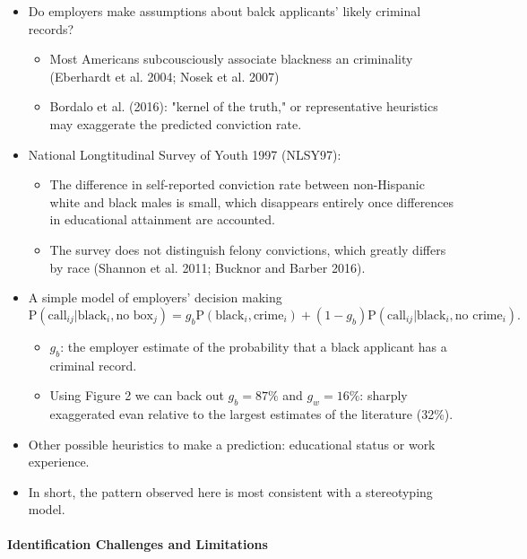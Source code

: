 \documentclass[../root]{subfiles}
\begin{document}
    \begin{itemize}
      \item Do employers make assumptions about balck applicants' likely criminal records?
      \begin{itemize}
        \item Most Americans subcousciously associate blackness an criminality (Eberhardt et al. 2004; Nosek et al. 2007)
        \item Bordalo et al. (2016): "kernel of the truth," or representative heuristics may exaggerate the predicted conviction rate.
      \end{itemize}
      \item National Longtitudinal Survey of Youth 1997 (NLSY97):
      \begin{itemize}
        \item The difference in self-reported conviction rate between non-Hispanic white and black males is small, which disappears entirely once differences in educational attainment are accounted.
        \item The survey does not distinguish felony convictions, which greatly differs by race (Shannon et al. 2011; Bucknor and Barber 2016).
      \end{itemize}
      \item A simple model of employers' decision making
      \[
      \text{P}(\text{call}_{ij} | \text{black}_i, \text{no box}_j) = g_b \text{P}(\text{black}_i, \text{crime}_i) + (1 - g_b) \text{P}(\text{call}_{ij} | \text{black}_i, \text{no crime}_i).
      \]
      \begin{itemize}
        \item $g_b$: the employer estimate of the probability that a black applicant has a criminal record.
        \item Using Figure 2 we can back out $g_b = 87\%$ and $g_w = 16\%$: sharply exaggerated evan relative to the largest estimates of the literature (32\%).
      \end{itemize}
      \item Other possible heuristics to make a prediction: educational status or work experience.
      \item In short, the pattern observed here is most consistent with a stereotyping model.
    \end{itemize}

    \paragraph{Identification Challenges and Limitations}
\end{document}
